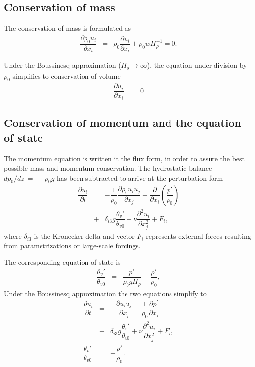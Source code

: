 \documentclass[gmd]{copernicus}
\begin{document}
\subsection{Conservation of mass}
The conservation of mass is formulated as
\begin{eqnarray}
\dfrac{\partial \rho_0 u_i}{\partial x_i} & = & \rho_0 \dfrac{\partial u_i}{\partial x_i} + \rho_0 w H_{\rho}^{-1} = 0 \label{eq:consmassa}.
\end{eqnarray}

Under the Boussinesq approximation ($H_{\rho} \rightarrow \infty$), the equation under division by $\rho_0$ simplifies to conservation of volume
\begin{eqnarray}
\dfrac{\partial u_i}{\partial x_i} & = & 0\label{eq:consmassb}
\end{eqnarray}

\subsection{Conservation of momentum and the equation of state}
The momentum equation is written it the flux form, in order to assure the best possible mass and momentum conservation. The hydrostatic balance $dp_0 / dz~=~-\rho_0 g$ has been subtracted to arrive at the perturbation form
\begin{eqnarray}
\nonumber \dfrac{\partial u_i}{\partial t} & = & - \dfrac{1}{\rho_0} \dfrac{\partial \rho_0 u_i u_j}{\partial x_j} 
- \dfrac{\partial}{\partial x_i}\left(\dfrac{p'}{\rho_0}\right) \\
& + & \delta_{i3} g \dfrac{\theta_v'}{\theta_{v0}} + \nu \dfrac{\partial^2 u_i}{\partial x_j^2} + F_i,\label{eq:consmoma}
\end{eqnarray}
where $\delta_{i3}$ is the Kronecker delta and vector $F_i$ represents external forces resulting from parametrizations or large-scale forcings.

The corresponding equation of state is
\begin{eqnarray}
\dfrac{\theta_v'}{\theta_{v0}} & = & \dfrac{p'}{\rho_0 g H_{\rho}} - \dfrac{\rho'}{\rho_0}\label{eq:statea},
\end{eqnarray}
Under the Boussinesq approximation the two equations simplify to
\begin{eqnarray}
\nonumber \dfrac{\partial u_i}{\partial t} & = & - \dfrac{\partial u_i u_j}{\partial x_j} - \dfrac{1}{\rho_0}\dfrac{\partial p^\prime}{\partial x_i} \\
& + & \delta_{i3} g \dfrac{\theta_v'}{\theta_{v0}} + \nu \dfrac{\partial^2 u_i}{\partial x_j^2} + F_i \label{eq:consmomb},\\
\dfrac{\theta_v'}{\theta_{v0}} & = & - \dfrac{\rho'}{\rho_0}\label{eq:stateb}.
\end{eqnarray}
\end{document}
